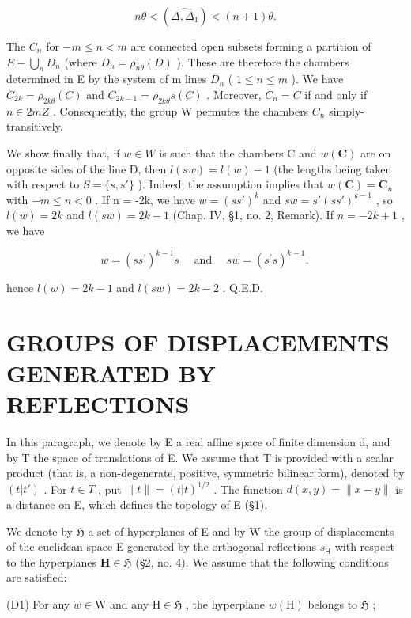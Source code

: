 \[
n \theta <   (\widehat {\Delta , \Delta_ {1}}) <   (n + 1) \theta .
\]

The \(C_{n}\) for \(-m \leqslant n < m\) are connected open subsets forming a partition of \(E - \bigcup_{n} D_{n}\) (where \(D_{n} = \rho_{n\theta}(D)\) ). These are therefore the chambers determined in E by the system of m lines \(D_{n}\) ( \(1 \leqslant n \leqslant m\) ). We have \(C_{2k} = \rho_{2k\theta}(C)\) and \(C_{2k-1} = \rho_{2k\theta}s(C)\) . Moreover, \(C_{n} = C\) if and only if \(n \in 2mZ\) . Consequently, the group W permutes the chambers \(C_{n}\) simply-transitively.

We show finally that, if \(w \in W\) is such that the chambers C and \(w(\mathbf{C})\) are on opposite sides of the line D, then \(l(sw) = l(w) - 1\) (the lengths being taken with respect to \(S = \{s, s'\}\) ). Indeed, the assumption implies that \(w(\mathbf{C}) = \mathbf{C}_n\) with \(-m \leqslant n < 0\) . If n = -2k, we have \(w = (ss')^k\) and \(sw = s'(ss')^{k-1}\) , so \(l(w) = 2k\) and \(l(sw) = 2k - 1\) (Chap. IV, §1, no. 2, Remark). If \(n = -2k + 1\) , we have

\[
w = \left(s s ^ {\prime}\right) ^ {k - 1} s \quad \text { and } \quad s w = \left(s ^ {\prime} s\right) ^ {k - 1},
\]

hence \(l(w) = 2k - 1\) and \(l(sw) = 2k - 2\) . Q.E.D.

\section{GROUPS OF DISPLACEMENTS GENERATED BY REFLECTIONS}

In this paragraph, we denote by E a real affine space of finite dimension d, and by T the space of translations of E. We assume that T is provided with a scalar product (that is, a non-degenerate, positive, symmetric bilinear form), denoted by \((t|t')\) . For \(t \in T\) , put \(\|t\| = (t|t)^{1/2}\) . The function \(d(x, y) = \|x - y\|\) is a distance on E, which defines the topology of E (§1).

We denote by \(\mathfrak{H}\) a set of hyperplanes of E and by W the group of displacements of the euclidean space E generated by the orthogonal reflections \(s_{\mathsf{H}}\) with respect to the hyperplanes \(\mathbf{H} \in \mathfrak{H}\) (§2, no. 4). We assume that the following conditions are satisfied:

(D1) For any \(w \in \mathrm{W}\) and any \(\mathrm{H} \in \mathfrak{H}\) , the hyperplane \(w(\mathrm{H})\) belongs to \(\mathfrak{H}\) ;

